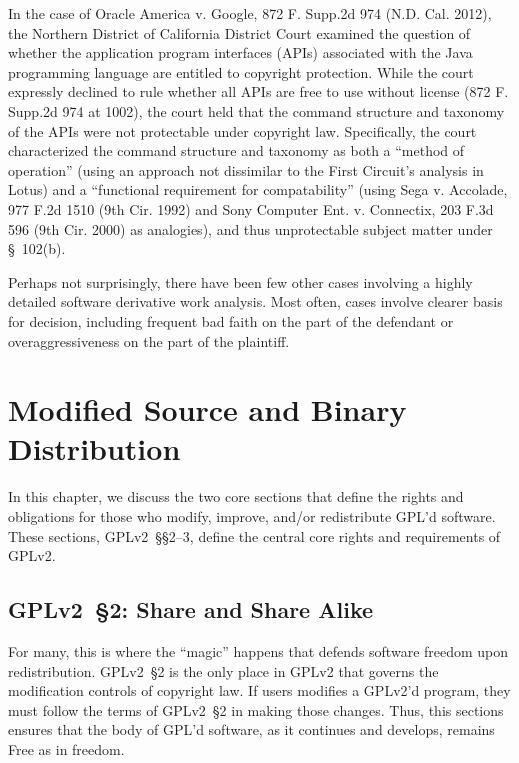 In the case of Oracle America v. Google, 872 F. Supp.2d 974 (N.D. Cal. 2012),
the Northern District of California District Court examined the question of 
whether the application program interfaces (APIs) associated with the Java
programming language are entitled to copyright protection.  While the 
court expressly declined to rule whether all APIs are free to use without 
license (872 F. Supp.2d 974 at 1002), the court held that the command 
structure and taxonomy of the APIs were not protectable under copyright law.
Specifically, the court characterized the command structure and taxonomy as
both a ``method of operation'' (using an approach not dissimilar to the 
First Circuit's analysis in Lotus) and a ``functional requirement for 
compatability'' (using Sega v. Accolade, 977 F.2d 1510 (9th Cir. 1992) and
Sony Computer Ent. v. Connectix, 203 F.3d 596 (9th Cir. 2000) as analogies),
and thus unprotectable subject matter under \S~102(b). 

Perhaps not surprisingly, there have been few other cases involving a highly
detailed software derivative work analysis. Most often, cases involve
clearer basis for decision, including frequent bad faith on the part of
the defendant or overaggressiveness on the part of the plaintiff.  


\chapter{Modified Source and Binary Distribution}
\label{source-and-binary}

In this chapter, we discuss the two core sections that define the rights
and obligations for those who modify, improve, and/or redistribute GPL'd
software. These sections, GPLv2~\S\S2--3, define the central core rights and
requirements of GPLv2\@.

\section{GPLv2~\S2: Share and Share Alike}

For many, this is where the ``magic'' happens that defends software
freedom upon redistribution.  GPLv2~\S2 is the only place in GPLv2
that governs the modification controls of copyright law.  If users
modifies a GPLv2'd program, they must follow the terms of GPLv2~\S2 in making
those changes.  Thus, this sections ensures that the body of GPL'd software, as it
continues and develops, remains Free as in freedom.


